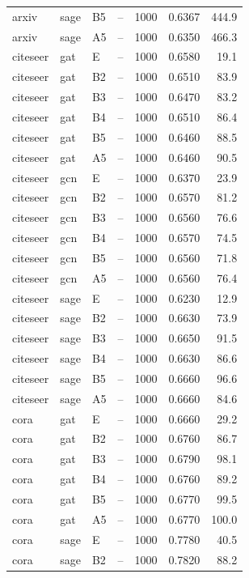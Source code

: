 \begin{longtable}{llllrrr}
\rowcolor{oursbg}
arxiv & sage & B5 & -- & 1000 & 0.6367 & 444.9 \\
arxiv & sage & A5 & -- & 1000 & 0.6350 & 466.3 \\
citeseer & gat & E & -- & 1000 & 0.6580 & 19.1 \\
citeseer & gat & B2 & -- & 1000 & 0.6510 & 83.9 \\
citeseer & gat & B3 & -- & 1000 & 0.6470 & 83.2 \\
citeseer & gat & B4 & -- & 1000 & 0.6510 & 86.4 \\
\rowcolor{oursbg}
citeseer & gat & B5 & -- & 1000 & 0.6460 & 88.5 \\
citeseer & gat & A5 & -- & 1000 & 0.6460 & 90.5 \\
citeseer & gcn & E & -- & 1000 & 0.6370 & 23.9 \\
citeseer & gcn & B2 & -- & 1000 & 0.6570 & 81.2 \\
citeseer & gcn & B3 & -- & 1000 & 0.6560 & 76.6 \\
citeseer & gcn & B4 & -- & 1000 & 0.6570 & 74.5 \\
\rowcolor{oursbg}
citeseer & gcn & B5 & -- & 1000 & 0.6560 & 71.8 \\
citeseer & gcn & A5 & -- & 1000 & 0.6560 & 76.4 \\
citeseer & sage & E & -- & 1000 & 0.6230 & 12.9 \\
citeseer & sage & B2 & -- & 1000 & 0.6630 & 73.9 \\
citeseer & sage & B3 & -- & 1000 & 0.6650 & 91.5 \\
citeseer & sage & B4 & -- & 1000 & 0.6630 & 86.6 \\
\rowcolor{oursbg}
citeseer & sage & B5 & -- & 1000 & 0.6660 & 96.6 \\
citeseer & sage & A5 & -- & 1000 & 0.6660 & 84.6 \\
cora & gat & E & -- & 1000 & 0.6660 & 29.2 \\
cora & gat & B2 & -- & 1000 & 0.6760 & 86.7 \\
cora & gat & B3 & -- & 1000 & 0.6790 & 98.1 \\
cora & gat & B4 & -- & 1000 & 0.6760 & 89.2 \\
\rowcolor{oursbg}
cora & gat & B5 & -- & 1000 & 0.6770 & 99.5 \\
cora & gat & A5 & -- & 1000 & 0.6770 & 100.0 \\
cora & sage & E & -- & 1000 & 0.7780 & 40.5 \\
cora & sage & B2 & -- & 1000 & 0.7820 & 88.2 \\

\end{longtable}
